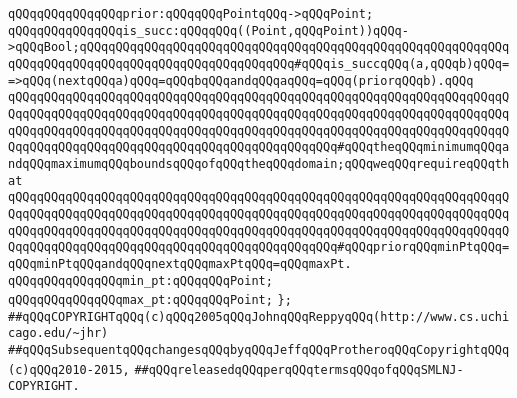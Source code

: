 \verb|qQQqqQQqqQQqqQQqprior:qQQqqQQqPointqQQq->qQQqPoint;|\newline
\newline
\verb|qQQqqQQqqQQqqQQqis_succ:qQQqqQQq((Point,qQQqPoint))qQQq->qQQqBool;qQQqqQQqqQQqqQQqqQQqqQQqqQQqqQQqqQQqqQQqqQQqqQQqqQQqqQQqqQQqqQQqqQQqqQQqqQQqqQQqqQQqqQQqqQQqqQQqqQQq#qQQqis_succqQQq(a,qQQqb)qQQq==>qQQq(nextqQQqa)qQQq=qQQqbqQQqandqQQqaqQQq=qQQq(priorqQQqb).qQQq|\newline
\newline
\verb|qQQqqQQqqQQqqQQqqQQqqQQqqQQqqQQqqQQqqQQqqQQqqQQqqQQqqQQqqQQqqQQqqQQqqQQqqQQqqQQqqQQqqQQqqQQqqQQqqQQqqQQqqQQqqQQqqQQqqQQqqQQqqQQqqQQqqQQqqQQqqQQqqQQqqQQqqQQqqQQqqQQqqQQqqQQqqQQqqQQqqQQqqQQqqQQqqQQqqQQqqQQqqQQqqQQqqQQqqQQqqQQqqQQqqQQqqQQqqQQqqQQqqQQqqQQqqQQq#qQQqtheqQQqminimumqQQqandqQQqmaximumqQQqboundsqQQqofqQQqtheqQQqdomain;qQQqweqQQqrequireqQQqthat|\newline
\verb|qQQqqQQqqQQqqQQqqQQqqQQqqQQqqQQqqQQqqQQqqQQqqQQqqQQqqQQqqQQqqQQqqQQqqQQqqQQqqQQqqQQqqQQqqQQqqQQqqQQqqQQqqQQqqQQqqQQqqQQqqQQqqQQqqQQqqQQqqQQqqQQqqQQqqQQqqQQqqQQqqQQqqQQqqQQqqQQqqQQqqQQqqQQqqQQqqQQqqQQqqQQqqQQqqQQqqQQqqQQqqQQqqQQqqQQqqQQqqQQqqQQqqQQqqQQqqQQq#qQQqpriorqQQqminPtqQQq=qQQqminPtqQQqandqQQqnextqQQqmaxPtqQQq=qQQqmaxPt.|\newline
\verb|qQQqqQQqqQQqqQQqmin_pt:qQQqqQQqPoint;|\newline
\verb|qQQqqQQqqQQqqQQqmax_pt:qQQqqQQqPoint;|\newline
\verb|};|\newline
\newline
\newline
\verb|##qQQqCOPYRIGHTqQQq(c)qQQq2005qQQqJohnqQQqReppyqQQq(http://www.cs.uchicago.edu/~jhr)|\newline
\verb|##qQQqSubsequentqQQqchangesqQQqbyqQQqJeffqQQqProtheroqQQqCopyrightqQQq(c)qQQq2010-2015,|\newline
\verb|##qQQqreleasedqQQqperqQQqtermsqQQqofqQQqSMLNJ-COPYRIGHT.|\newline

